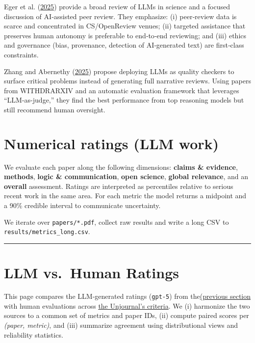 \documentclass[
  11pt,
  letterpaper,
  DIV=11,
  numbers=noendperiod]{scrreprt}
\begin{document}
Eger et al. (\protect\hyperlink{ref-eger2025}{2025}) provide a broad
review of LLMs in science and a focused discussion of AI‑assisted peer
review. They emphasize: (i) peer‑review data is scarce and concentrated
in CS/OpenReview venues; (ii) targeted assistance that preserves human
autonomy is preferable to end‑to‑end reviewing; and (iii) ethics and
governance (bias, provenance, detection of AI‑generated text) are
first‑class constraints.

Zhang and Abernethy (\protect\hyperlink{ref-Zhang2025}{2025}) propose
deploying LLMs as quality checkers to surface critical problems instead
of generating full narrative reviews. Using papers from WITHDRARXIV and
an automatic evaluation framework that leverages ``LLM-as-judge,'' they
find the best performance from top reasoning models but still recommend
human oversight.


\hypertarget{numerical-ratings-llm-work}{%
\chapter{Numerical ratings (LLM
work)}\label{numerical-ratings-llm-work}}

We evaluate each paper along the following dimensions: \textbf{claims \&
evidence}, \textbf{methods}, \textbf{logic \& communication},
\textbf{open science}, \textbf{global relevance}, and an
\textbf{overall} assessment. Ratings are interpreted as percentiles
relative to serious recent work in the same area. For each metric the
model returns a midpoint and a 90\% credible interval to communicate
uncertainty.

We iterate over \texttt{papers/*.pdf}, collect raw results and write a
long CSV to \texttt{results/metrics\_long.csv}.

\begin{center}\rule{0.5\linewidth}{0.5pt}\end{center}


\hypertarget{llm-vs.-human-ratings}{%
\chapter{LLM vs.~Human Ratings}\label{llm-vs.-human-ratings}}

This page compares the LLM‑generated ratings (\texttt{gpt-5}) from
the\protect\hyperlink{numerical-ratings-llm-work}{(previous section}
with human evaluations across
\href{https://globalimpact.gitbook.io/the-unjournal-project-and-communication-space/policies-projects-evaluation-workflow/evaluation/guidelines-for-evaluators\#undefined-1}{the
Unjournal's criteria}. We (i) harmonize the two sources to a common set
of metrics and paper IDs, (ii) compute paired scores per \emph{(paper,
metric)}, and (iii) summarize agreement using distributional views and
reliability statistics.
\end{document}
